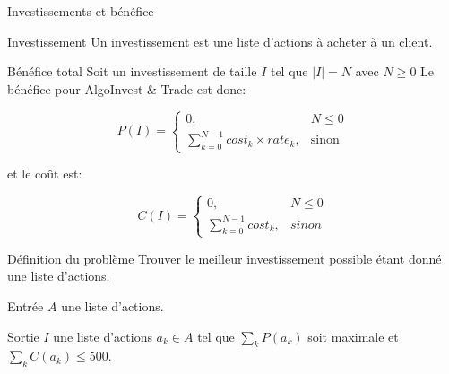 \begin{frame}{Investissements et bénéfice}

  \begin{block}{Investissement}
    Un investissement est une liste d'actions à acheter à un client.
  \end{block}
  
  \begin{block}{Bénéfice total}
    Soit un investissement de taille $I$ tel que $|I| = N$ avec $N \ge 0$    
    Le bénéfice pour AlgoInvest \& Trade est donc:

    \begin{equation}
      P(I) =
      \begin{cases}
        0, & N \le 0 \\
        \sum _{k = 0}^{N - 1} cost_k \times rate_k, & \mbox{sinon}
      \end{cases}      
    \end{equation}

    et le coût est:
    
    \begin{equation}
      C(I) = 
      \begin{cases}
        0, & N \le 0 \\
        {\sum_{k = 0}^{N - 1} cost_k}, & sinon
      \end{cases}      
    \end{equation}
  \end{block}
\end{frame}

\begin{frame}{Définition du problème}
  Trouver le meilleur investissement possible étant donné une liste
  d'actions.

  \begin{block}{Entrée}
    $A$ une liste d'actions.
  \end{block}

  \begin{block}{Sortie}
    $I$ une liste d'actions $a_k \in A$ tel que $\sum_k P(a_k)$ soit maximale
    et $\sum_k C(a_k) \le 500$.
  \end{block}
  
\end{frame}
